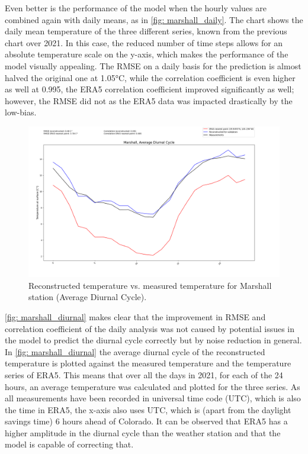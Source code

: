 Even better is the performance of the model when the hourly values are combined again with daily means, as in \autoref{fig: marshall_daily}.
The chart shows the daily mean temperature of the three different series, known from the previous chart over 2021.
In this case, the reduced number of time steps allows for an absolute temperature scale on the y-axis, which makes the performance of the model visually appealing.
The RMSE on a daily basis for the prediction is almost halved the original one at 1.05°C, while the correlation coefficient is even higher as well at 0.995, the ERA5 correlation coefficient improved significantly as well; however, the RMSE did not as the ERA5 data was impacted drastically by the low-bias.

\begin{figure}
    \centering
    \includegraphics[width=1.00\textwidth]{resources/images/charts/marshall_eval_grib_final/Marshall, Average Diurnal Cycle.png}
    \caption{Reconstructed temperature vs. measured temperature for Marshall station (Average Diurnal Cycle).}
    \label{fig: marshall_diurnal}
\end{figure}

\autoref{fig: marshall_diurnal} makes clear that the improvement in RMSE and correlation coefficient of the daily analysis was not caused by potential issues in the model to predict the diurnal cycle correctly but by noise reduction in general.
In \autoref{fig: marshall_diurnal} the average diurnal cycle of the reconstructed temperature is plotted against the measured temperature and the temperature series of ERA5.
This means that over all the days in 2021, for each of the 24 hours, an average temperature was calculated and plotted for the three series.
As all measurements have been recorded in universal time code (UTC), which is also the time in ERA5, the x-axis also uses UTC, which is (apart from the daylight savings time) 6 hours ahead of Colorado.
It can be observed that ERA5 has a higher amplitude in the diurnal cycle than the weather station and that the model is capable of correcting that.

